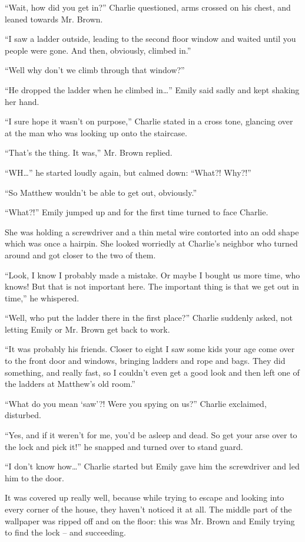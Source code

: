 “Wait, how did you get in?” Charlie questioned, arms crossed on his chest, and leaned towards Mr. Brown.

“I saw a ladder outside, leading to the second floor window and waited until you people were gone. And then, obviously, climbed in.”

“Well why don’t we climb through that window?”

“He dropped the ladder when he climbed in…” Emily said sadly and kept shaking her hand.

“I sure hope it wasn’t on purpose,” Charlie stated in a cross tone, glancing over at the man who was looking up onto the staircase.

“That’s the thing. It was,” Mr. Brown replied.

“WH…” he started loudly again, but calmed down: “What?! Why?!”

“So Matthew wouldn’t be able to get out, obviously.”

“What?!” Emily jumped up and for the first time turned to face Charlie.

She was holding a screwdriver and a thin metal wire contorted into an odd shape which was once a hairpin. She looked worriedly at Charlie’s neighbor who turned around and got closer to the two of them.

“Look, I know I probably made a mistake. Or maybe I bought us more time, who knows! But that is not important here. The important thing is that we get out in time,” he whispered.

“Well, who put the ladder there in the first place?” Charlie suddenly asked, not letting Emily or Mr. Brown get back to work.

“It was probably his friends. Closer to eight I saw some kids your age come over to the front door and windows, bringing ladders and rope and bags. They did something, and really fast, so I couldn’t even get a good look and then left one of the ladders at Matthew’s old room.”

“What do you mean ‘saw’?! Were you spying on us?” Charlie exclaimed, disturbed.

“Yes, and if it weren’t for me, you’d be asleep and dead. So get your arse over to the lock and pick it!” he snapped and turned over to stand guard.

“I don’t know how…” Charlie started but Emily gave him the screwdriver and led him to the door.

It was covered up really well, because while trying to escape and looking into every corner of the house, they haven’t noticed it at all. The middle part of the wallpaper was ripped off and on the floor: this was Mr. Brown and Emily trying to find the lock – and succeeding.

